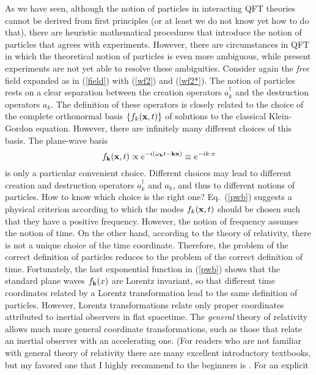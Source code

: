 \documentclass[12pt]{article}
\begin{document}
As we have seen,
although the notion of particles in interacting QFT theories 
cannot be derived from first principles (or at least 
we do not know yet how to do that), there are heuristic    
mathematical procedures that introduce the notion of particles 
that agrees with experiments. However, there are circumstances
in QFT in which the theoretical notion of particles is even more ambiguous, 
while present experiments are not yet able to resolve these ambiguities.
Consider again the {\em free} field expanded as in 
(\ref{field}) with (\ref{wf2}) and (\ref{wf2*}).  
The notion of particles rests on a clear separation
between the creation operators $a_k^{\dagger}$ and the destruction 
operators $a_k$. The definition of these operators is 
closely related to the choice of the complete orthonormal 
basis $\{ f_k({\bf x},t) \}$ of solutions to the classical 
Klein-Gordon equation. However, there are 
infinitely many different choices of this basis. 
The plane-wave basis 
\begin{equation}\label{pwb}
f_{\bf k}({\bf x},t) \propto e^{-i(\omega_{\bf k}t-{\bf k}{\bf x})}
\equiv e^{-ik\cdot x} 
\end{equation}
is only a particular convenient choice. Different choices may lead 
to different creation and destruction operators $a_k^{\dagger}$ and 
$a_k$, and thus to different notions of particles. 
How to know which choice is the right one? Eq.~(\ref{pwb}) 
suggests a physical criterion according to which 
the modes $f_k({\bf x},t)$ should be chosen such that 
they have a positive frequency. However, the notion of 
frequency assumes the notion of time. On the other hand, 
according to the theory of relativity, there is not 
a unique choice of the time coordinate. Therefore, 
the problem of the correct definition of particles reduces 
to the problem of the correct definition of time.
Fortunately, the last exponential function in (\ref{pwb}) shows that 
the standard plane waves $f_{\bf k}(x)$ are Lorentz invariant, 
so that different time coordinates related by a Lorentz 
transformation lead to the same definition of particles.
However, Lorentz transformations relate only proper coordinates 
attributed to inertial observers in flat spacetime.
The {\em general} theory of relativity allows much more 
general coordinate transformations, such as those that 
relate an inertial observer with an accelerating one.
(For readers who are not familiar with general 
theory of relativity there are many excellent introductory
textbooks, but my favored one that I highly recommend 
to the beginners is \cite{carrol}. For an explicit 
\end{document}
